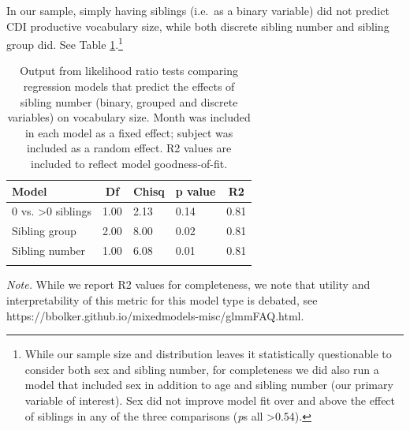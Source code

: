 \documentclass[
  man,mask,floatsintext]{apa6}
\begin{document}
In our sample, simply having siblings (i.e.~as a binary variable) did not predict CDI productive vocabulary size, while both discrete sibling number and sibling group did. See Table \ref{tab:table-sibling-model-output}.\footnote{While our sample size and distribution leaves it statistically questionable to consider both sex and sibling number, for completeness we did also run a model that included sex in addition to age and sibling number (our primary variable of interest). Sex did not improve model fit over and above the effect of siblings in any of the three comparisons (\emph{p}s all \textgreater0.54).}

\begin{table}[H]

\begin{center}
\begin{threeparttable}

\caption{\label{tab:table-sibling-model-output}Output from likelihood ratio tests comparing regression models that predict the effects of sibling number (binary, grouped and discrete variables) on vocabulary size. Month was included in each model as a fixed effect; subject was included as a random effect. R2 values are included to reflect model goodness-of-fit.}

\small{

\begin{tabular}{lllll}
\toprule
Model & \multicolumn{1}{c}{Df} & \multicolumn{1}{c}{Chisq} & \multicolumn{1}{c}{p value} & \multicolumn{1}{c}{R2}\\
\midrule
0 vs. >0 siblings & 1.00 & 2.13 & 0.14 & 0.81\\
Sibling group & 2.00 & 8.00 & 0.02 & 0.81\\
Sibling number & 1.00 & 6.08 & 0.01 & 0.81\\
\bottomrule
\addlinespace
\end{tabular}

}

\begin{tablenotes}[para]
\normalsize{\textit{Note.} While we report R2 values for completeness, we note that utility and interpretability of this metric for this model type is debated, see https://bbolker.github.io/mixedmodels-misc/glmmFAQ.html.}
\end{tablenotes}

\end{threeparttable}
\end{center}

\end{table}
\end{document}
